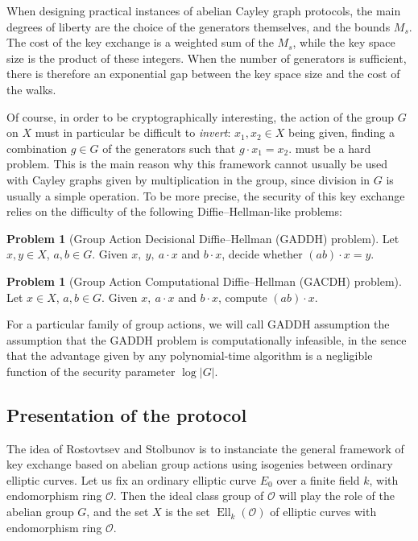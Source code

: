 \documentclass{article}
\renewcommand{\O}{\mathcal{O}}
\theoremstyle{definition}
\newtheorem{prob}[theorem]{Problem}
\DeclareMathOperator{\Ell}{Ell}
\begin{document}
When designing practical instances of abelian Cayley graph
protocols, the main degrees of liberty are the choice of the generators themselves,
and the bounds $M_s$. The cost of the key exchange is a weighted
sum of the $M_s$, while the key space size is the product of these integers. When
the number of generators is sufficient, there is therefore an exponential gap
between the key space size and the cost of the walks.

Of course, in order to be
cryptographically interesting, the action of the group $G$ on $X$ must in particular
be difficult to \emph{invert}: $x_1, x_2\in X$ being given, finding a combination
$g\in G$ of the generators such that $g\cdot x_1 = x_2$. must be a hard problem.
This is the main reason why this framework cannot usually be used with
Cayley graphs given by multiplication in the group, since division in $G$ is usually
a simple operation. To be more precise, the security of this key exchange relies
on the difficulty of the following Diffie--Hellman-like problems:

\begin{prob}[Group Action Decisional Diffie--Hellman (GADDH) problem] Let $x, y\in X$,
$a, b\in G$. Given $x,\ y,\ a\cdot x$ and $b\cdot x$, decide whether $(ab)\cdot x = y$.
\end{prob}

\begin{prob}[Group Action Computational Diffie--Hellman (GACDH) problem] Let $x\in X$,
$a, b\in G$. Given $x,\ a\cdot x$ and $b\cdot x$, compute $(ab)\cdot x$.
\end{prob}

For a particular family of group actions, we will call GADDH assumption the assumption
that the GADDH problem is computationally infeasible, in the sence that the advantage
given by any polynomial-time algorithm is a negligible function of the security parameter
$\log|G|$.

\subsection{Presentation of the protocol}

The idea of Rostovtsev and Stolbunov is to instanciate the general framework of
key exchange based on abelian group actions using isogenies between ordinary elliptic
curves. Let us fix an ordinary elliptic curve $E_0$ over a finite field $k$, with
endomorphism ring $\O$. Then the ideal class group of $\O$ will play the role of
the abelian group $G$, and the set $X$ is the set $\Ell_k(\O)$ of elliptic curves
with endomorphism ring $\O$.
\end{document}
